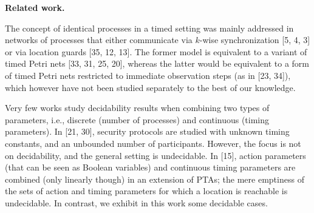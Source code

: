 \documentclass[10pt,a4paper]{article}
\begin{document}
\par\medskip\noindent\textbf{Related work.}\par
 
 
The concept of identical processes in a timed setting was mainly addressed in networks of processes that either communicate via $k$-wise synchronization [5, 4, 3] or via location guards [35, 12, 13]. The former model is equivalent to a variant of timed Petri nets [33, 31, 25, 20], whereas the latter would be equivalent to a form of timed Petri nets restricted to immediate observation steps (as in [23, 34]), which however have not been studied separately to the best of our knowledge.\par
 
 
 
Very few works study decidability results when combining two types of parameters, i.e., discrete (number of processes) and continuous (timing parameters). In [21, 30], security protocols are studied with unknown timing constants, and an unbounded number of participants. However, the focus is not on decidability, and the general setting is undecidable. In [15], action parameters (that can be seen as Boolean variables) and continuous timing parameters are combined (only linearly though) in an extension of PTAs; the mere emptiness of the sets of action and timing parameters for which a location is reachable is undecidable. In contrast, we exhibit in this work some decidable cases.\par
 
 
 
\end{document}
